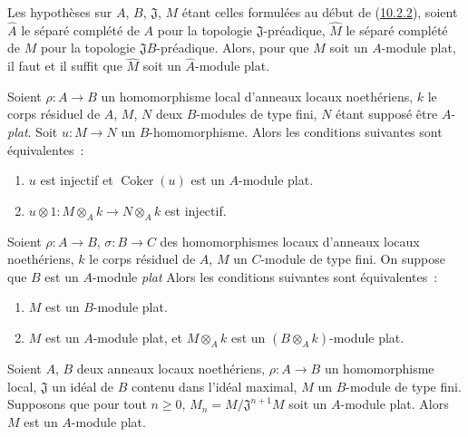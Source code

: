 \begin{env}[10.2.3]
\label{0.10.2.3-fr}
Les hypothèses sur $A$, $B$, $\mathfrak{J}$, $M$ étant celles formulées au
début de (\hyperref[0.10.2.2-fr]{10.2.2}), soient $\widehat A$ le séparé
complété de $A$ pour la topologie $\mathfrak{J}$-préadique, $\widehat M$ le
séparé complété de $M$ pour la topologie $\mathfrak{J}B$-préadique. Alors,
pour que $M$ soit un $A$-module plat, il faut et il suffit que $\widehat M$
soit un $\widehat A$-module plat.
\end{env}

\begin{env}[10.2.4]
\label{0.10.2.4-fr}
Soient $\rho:A\to B$ un homomorphisme local d'anneaux locaux noethériens, $k$
le corps résiduel de $A$, $M$, $N$ deux $B$-modules de type fini, $N$ étant
supposé être $A$-\emph{plat}. Soit $u:M\to N$ un $B$-homomorphisme. Alors les
conditions suivantes sont équivalentes~:
\begin{enumerate}
  \item[a)] $u$ est injectif et $\operatorname{Coker}(u)$ est un $A$-module plat.
  \item[b)] $u\otimes1:M\otimes_A k\to N\otimes_A k$ est injectif.
\end{enumerate}
\end{env}

\begin{env}[10.2.5]
\label{0.10.2.5-fr}
Soient $\rho:A\to B$, $\sigma:B\to C$ des homomorphismes locaux d'anneaux
locaux noethériens, $k$ le corps résiduel de $A$, $M$ un $C$-module de type
fini. On suppose que $B$ est un $A$-module \emph{plat} Alors les conditions
suivantes sont équivalentes~:
\begin{enumerate}
  \item[$a)$] $M$ est un $B$-module plat.
  \item[$b)$] $M$ est un $A$-module plat, et $M\otimes_A k$ est un
    $(B\otimes_A k)$-module plat.
\end{enumerate}
\end{env}

\begin{proposition}[10.2.6]
\label{0.10.2.6-fr}
Soient $A$, $B$ deux anneaux locaux noethériens, $\rho:A\to B$ un
homomorphisme local, $\mathfrak{J}$ un idéal de $B$ contenu dans l'idéal
maximal, $M$ un $B$-module de type fini. Supposons que pour tout $n\geq0$,
$M_n=M/\mathfrak{J}^{n+1}M$ soit un $A$-module plat. Alors $M$ est un
$A$-module plat.
\end{proposition}

